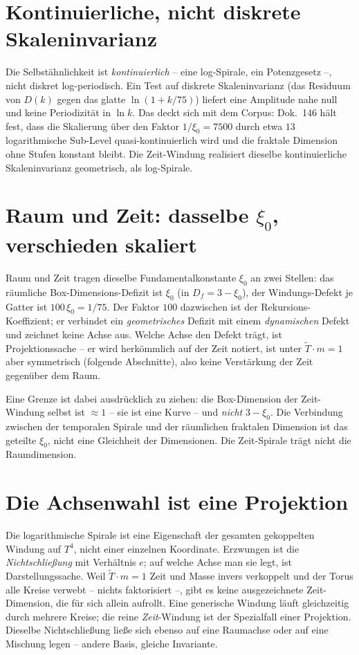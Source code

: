 \section{Kontinuierliche, nicht diskrete Skaleninvarianz}
Die Selbstähnlichkeit ist \emph{kontinuierlich} -- eine log-Spirale, ein Potenzgesetz --, nicht
diskret log-periodisch. Ein Test auf diskrete Skaleninvarianz (das Residuum von $D(k)$ gegen das
glatte $\ln(1+k/75)$) liefert eine Amplitude nahe null und keine Periodizität in $\ln k$. Das
deckt sich mit dem Corpus: Dok.~146 hält fest, dass die Skalierung über den Faktor
$1/\xi_0=7500$ durch etwa $13$ logarithmische Sub-Level quasi-kontinuierlich wird und die
fraktale Dimension ohne Stufen konstant bleibt. Die Zeit-Windung realisiert dieselbe
kontinuierliche Skaleninvarianz geometrisch, als log-Spirale.

\section{Raum und Zeit: dasselbe $\xi_0$, verschieden skaliert}
Raum und Zeit tragen dieselbe Fundamentalkonstante $\xi_0$ an zwei Stellen: das räumliche
Box-Dimensions-Defizit ist $\xi_0$ (in $D_f=3-\xi_0$), der Windungs-Defekt je Gatter ist
$100\,\xi_0=1/75$. Der Faktor $100$ dazwischen ist der Rekursions-Koeffizient; er verbindet ein
\emph{geometrisches} Defizit mit einem \emph{dynamischen} Defekt und zeichnet keine Achse aus.
Welche Achse den Defekt trägt, ist Projektionssache -- er wird herkömmlich auf der Zeit notiert,
ist unter $\tilde T\cdot m=1$ aber symmetrisch (folgende Abschnitte), also keine Verstärkung der
Zeit gegenüber dem Raum.

Eine Grenze ist dabei ausdrücklich zu ziehen: die Box-Dimension der Zeit-Windung selbst ist
$\approx 1$ -- sie ist eine Kurve -- und \emph{nicht} $3-\xi_0$. Die Verbindung zwischen der
temporalen Spirale und der räumlichen fraktalen Dimension ist das geteilte $\xi_0$, nicht eine
Gleichheit der Dimensionen. Die Zeit-Spirale trägt nicht die Raumdimension.

\section{Die Achsenwahl ist eine Projektion}
Die logarithmische Spirale ist eine Eigenschaft der gesamten gekoppelten Windung auf $T^4$, nicht
einer einzelnen Koordinate. Erzwungen ist die \emph{Nichtschließung} mit Verhältnis $e$; auf
welche Achse man sie legt, ist Darstellungssache. Weil $\tilde T\cdot m=1$ Zeit und Masse invers
verkoppelt und der Torus alle Kreise verwebt -- nichts faktorisiert --, gibt es keine
ausgezeichnete Zeit-Dimension, die für sich allein aufrollt. Eine generische Windung läuft
gleichzeitig durch mehrere Kreise; die reine \emph{Zeit}-Windung ist der Spezialfall einer
Projektion. Dieselbe Nichtschließung ließe sich ebenso auf eine Raumachse oder auf eine Mischung
legen -- andere Basis, gleiche Invariante.

